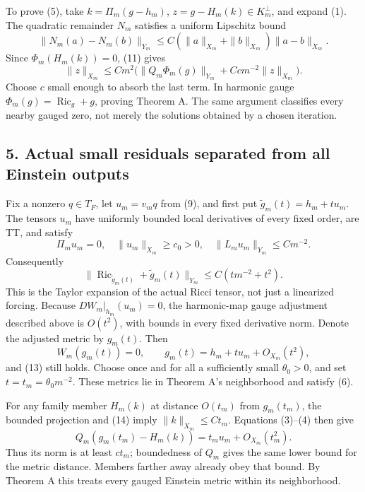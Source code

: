\documentclass[
  11pt,
]{article}
\begin{document}
To prove (5), take \(k=\Pi_m(g-h_m)\), \(z=g-H_m(k)\in K_m^\perp\), and
expand (1). The quadratic remainder \(N_m\) satisfies a uniform
Lipschitz bound \[
 \|N_m(a)-N_m(b)\|_{Y_m}
 \le C(\|a\|_{X_m}+\|b\|_{X_m})\|a-b\|_{X_m}.
\] Since \(\Phi_m(H_m(k))=0\), (11) gives \[
 \|z\|_{X_m}\le C m^2\bigl(\|Q_m\Phi_m(g)\|_{Y_m}
                                +Ccm^{-2}\|z\|_{X_m}\bigr).
\] Choose \(c\) small enough to absorb the last term. In harmonic gauge
\(\Phi_m(g)=\operatorname{Ric}_g+g\), proving Theorem A. The same
argument classifies every nearby gauged zero, not merely the solutions
obtained by a chosen iteration.

\hypertarget{actual-small-residuals-separated-from-all-einstein-outputs}{%
\subsection{5. Actual small residuals separated from all Einstein
outputs}\label{actual-small-residuals-separated-from-all-einstein-outputs}}

Fix a nonzero \(q\in T_F\), let \(u_m=v_mq\) from (9), and first put
\(\widetilde g_m(t)=h_m+t u_m\). The tensors \(u_m\) have uniformly
bounded local derivatives of every fixed order, are TT, and satisfy \[
 \Pi_mu_m=0,\quad \|u_m\|_{X_m}\ge c_0>0,
 \quad \|L_mu_m\|_{Y_m}\le C m^{-2}.
\] Consequently \[
 \|\operatorname{Ric}_{\widetilde g_m(t)}+\widetilde g_m(t)\|_{Y_m}
                         \le C(t m^{-2}+t^2).              \tag{13}
\] This is the Taylor expansion of the actual Ricci tensor, not just a
linearized forcing. Because \(DW_m|_{h_m}(u_m)=0\), the harmonic-map
gauge adjustment described above is \(O(t^2)\), with bounds in every
fixed derivative norm. Denote the adjusted metric by \(g_m(t)\). Then \[
 W_m(g_m(t))=0,\qquad
 g_m(t)=h_m+t u_m+O_{X_m}(t^2),                              \tag{14}
\] and (13) still holds. Choose once and for all a sufficiently small
\(\theta_0>0\), and set \(t=t_m=\theta_0m^{-2}\). These metrics lie in
Theorem A's neighborhood and satisfy (6).

For any family member \(H_m(k)\) at distance \(O(t_m)\) from
\(g_m(t_m)\), the bounded projection and (14) imply
\(\|k\|_{X_m}\le C t_m\). Equations (3)--(4) then give \[
 Q_m(g_m(t_m)-H_m(k))=t_m u_m+O_{X_m}(t_m^2).
\] Thus its norm is at least \(c t_m\); boundedness of \(Q_m\) gives the
same lower bound for the metric distance. Members farther away already
obey that bound. By Theorem A this treats every gauged Einstein metric
within its neighborhood.
\end{document}
